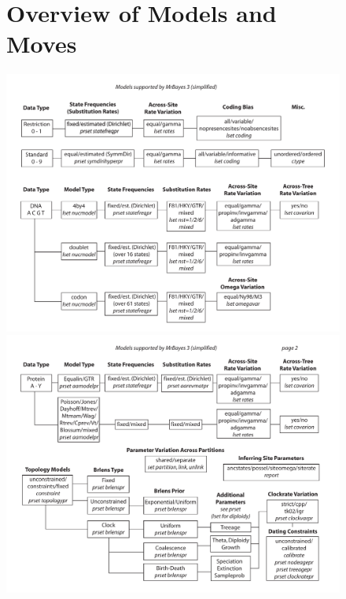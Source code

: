 \documentclass[12pt]{book}
\begin{document}
\begin{figure}[h]
\chapter{Overview of Models and Moves}\label{appendixOverview}
\hspace{-12mm}\includegraphics[width=0.85\textheight]{Appendix_Fig1.pdf}\newpage
\hspace{-8mm}\includegraphics[width=0.85\textheight]{Appendix_Fig2.pdf}

\end{figure}
\end{document}
